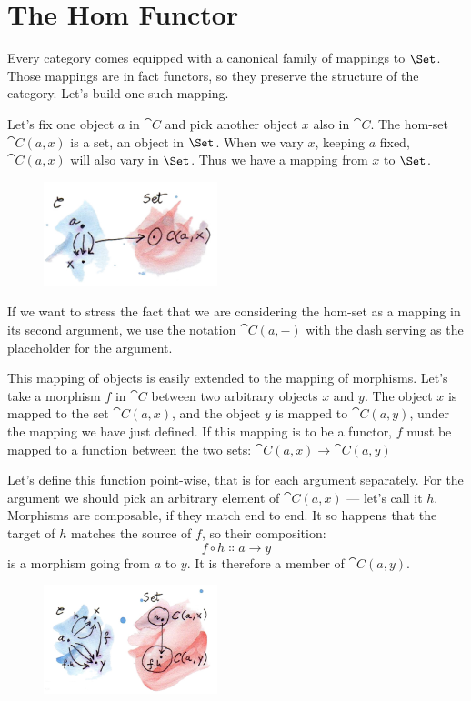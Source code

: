 \section{The Hom Functor}

Every category comes equipped with a canonical family of mappings to
$\Set$. Those mappings are in fact functors, so they preserve the
structure of the category. Let's build one such mapping.

Let's fix one object $a$ in $\cat{C}$ and pick another object
$x$ also in $\cat{C}$. The hom-set $\cat{C}(a, x)$ is a set, an
object in $\Set$. When we vary $x$, keeping $a$
fixed, $\cat{C}(a, x)$ will also vary in $\Set$. Thus we have a
mapping from $x$ to $\Set$.

\begin{figure}[H]
\centering
\includegraphics[width=0.45\textwidth]{images/hom-set.jpg}
\end{figure}

\noindent
If we want to stress the fact that we are considering the hom-set as a
mapping in its second argument, we use the notation $\cat{C}(a, -)$
with the dash serving as the placeholder for the argument.

This mapping of objects is easily extended to the mapping of morphisms.
Let's take a morphism $f$ in $\cat{C}$ between two arbitrary
objects $x$ and $y$. The object $x$ is mapped to
the set $\cat{C}(a, x)$, and the object $y$ is mapped to
$\cat{C}(a, y)$, under the mapping we have just defined. If this
mapping is to be a functor, $f$ must be mapped to a function
between the two sets: $\cat{C}(a, x) \to \cat{C}(a, y)$

Let's define this function point-wise, that is for each argument
separately. For the argument we should pick an arbitrary element of
$\cat{C}(a, x)$ --- let's call it $h$. Morphisms are
composable, if they match end to end. It so happens that the target of
$h$ matches the source of $f$, so their composition:
\[f \circ h \Colon a \to y\]
is a morphism going from $a$ to $y$. It is therefore a
member of $\cat{C}(a, y)$.

\begin{figure}[H]
\centering
\includegraphics[width=0.45\textwidth]{images/hom-functor.jpg}
\end{figure}

